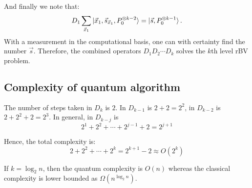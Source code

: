 \documentclass{article}
\begin{document}
And finally we note that:
\begin{equation}
  D_1 \sum_{\vec{x}_1}\ket{\vec{x}_1, \vec{s}_{\vec{x}_1}, P_0^{\otimes k-2}} =
  \ket{\vec{s}, P_0^{\otimes k-1}}.
\end{equation}
With a measurement in the computational basis, one can with certainty find the
number $\vec{s}$. Therefore, the combined operators $D_1D_2\cdots D_k$ solves
the $k$th level rBV problem.

\subsection{Complexity of quantum algorithm}
\label{sec:Complexity of quantum algorithm}
The number of steps taken in $D_k$ is $2$. In $D_{k-1}$ is $2+2=2^2$, in
$D_{k-2}$ is $2+2^2+2=2^3$. In general, in $D_{k-j}$ is
\begin{equation}
  2^1 + 2^2 + \cdots + 2^{j-1} + 2 = 2^{j+1}
\end{equation}

Hence, the total complexity is:
\begin{equation}
  2 + 2^2 + \cdots + 2^k = 2^{k+1}-2 \approx O(2^k)
\end{equation}

If $k=\log_2 n$, then the quantum complexity is $O(n)$ whereas the classical
complexity is lower bounded as $\Omega(n^{\log_2 n})$.
\end{document}

